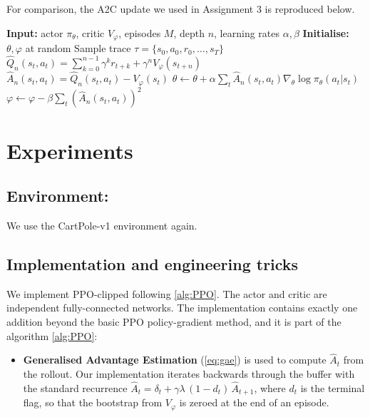 \documentclass{article}
\theoremstyle{plain}
\theoremstyle{definition}
\theoremstyle{remark}
\begin{document}
For comparison, the A2C update we used in Assignment 3 is reproduced below.
\begingroup
\setlength{\intextsep}{15pt}
\setlength{\textfloatsep}{0pt}
\begin{algorithm}[H]
    \caption{Advantage Actor Critic (A2C); reproduced from Assignment 3}
    \begin{algorithmic}
        \STATE \textbf{Input:} actor $\pi_\theta$, critic $V_\varphi$, episodes $M$, depth $n$, learning rates $\alpha,\beta$
        \STATE \textbf{Initialise:} $\theta,\varphi$ at random
            \STATE Sample trace $\tau=\{s_0,a_0,r_0,\ldots,s_T\}$
                \STATE $\hat Q_n(s_t,a_t)=\sum_{k=0}^{n-1}\gamma^k r_{t+k}+\gamma^{n}V_\varphi(s_{t+n})$
                \STATE $\hat A_n(s_t,a_t)=\hat Q_n(s_t,a_t)-V_\varphi(s_t)$
            \ENDFOR
            \STATE $\theta\!\leftarrow\!\theta+\alpha\sum_t \hat A_n(s_t,a_t)\nabla_\theta\log\pi_\theta(a_t|s_t)$
            \STATE $\varphi\!\leftarrow\!\varphi-\beta\sum_t (\hat A_n(s_t,a_t))^{2}$
        \ENDFOR
    \end{algorithmic}
    \label{alg:A2C-ref}
\end{algorithm}
\endgroup

\section{Experiments}\label{sec:experiments}

\subsection{Environment:}\label{sec:experiments:env}

We use the CartPole-v1 environment again.

\subsection{Implementation and engineering tricks}\label{sec:experiments:impl}

We implement PPO-clipped following \autoref{alg:PPO}. The actor and critic are independent fully-connected networks. The implementation contains exactly one addition beyond the basic PPO policy-gradient method, and it is part of the algorithm \autoref{alg:PPO}:

\begin{itemize}
    \item \textbf{Generalised Advantage Estimation} (\cref{eq:gae}) is used to compute $\hat A_t$ from the rollout. Our implementation iterates backwards through the buffer with the standard recurrence $\hat A_t = \delta_t + \gamma\lambda\,(1-d_t)\,\hat A_{t+1}$, where $d_t$ is the terminal flag, so that the bootstrap from $V_\varphi$ is zeroed at the end of an episode.
\end{itemize}
\end{document}
